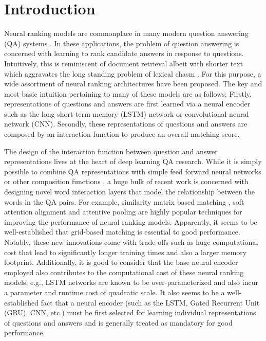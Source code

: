 \documentclass[sigconf]{acmart}
\begin{document}
\section{Introduction}
Neural ranking models are commonplace in many modern question answering (QA) systems \cite{DBLP:conf/sigir/SeverynM15,DBLP:conf/naacl/HeL16}. In these applications,
the problem of question answering is concerned with learning to rank candidate answers in response to questions. Intuitively, this is reminiscent of document retrieval albeit with shorter text which aggravates the long standing problem of lexical chasm \cite{DBLP:conf/sigir/BergerCCFM00}. 
For this purpose, a wide assortment of neural ranking architectures have been proposed. The key and most basic intuition pertaining to many of these models are as
follows: Firstly, representations of questions and answers are first learned via a neural encoder such as the long short-term memory (LSTM) \cite{hochreiter1997long} network or convolutional neural network (CNN). Secondly, these representations of questions and answers are composed by an interaction function to produce an overall matching score. 

The design of the interaction function between question and answer representations lives at the heart of deep learning QA research. While it is simply possible to combine QA representations with simple feed forward neural networks or other composition functions \cite{DBLP:conf/ijcai/QiuH15,DBLP:conf/sigir/TayPLH17}, a huge bulk of recent work is concerned with designing novel word interaction layers that model the relationship between the words in the QA pairs. For example, similarity matrix based matching \cite{DBLP:conf/aaai/WanLGXPC16}, soft attention alignment \cite{DBLP:conf/emnlp/ParikhT0U16} and attentive pooling \cite{DBLP:journals/corr/SantosTXZ16} are highly popular techniques for improving the performance of neural ranking models. Apparently, it seems to be well-established that grid-based matching is essential to good performance. Notably, these new innovations come with trade-offs such as huge computational cost that lead to significantly longer training times and also a larger memory footprint. Additionally, it is good to consider that the base neural encoder employed also contributes to the computational cost of these neural ranking models, e.g., LSTM networks are known to be over-parameterized and also incur a parameter and runtime cost of quadratic scale. It also seems to be a well-established fact that a neural encoder (such as the LSTM, Gated Recurrent Unit (GRU), CNN, etc.) must be first selected for learning individual representations of questions and answers and is generally treated as mandatory for good performance. 
\end{document}

